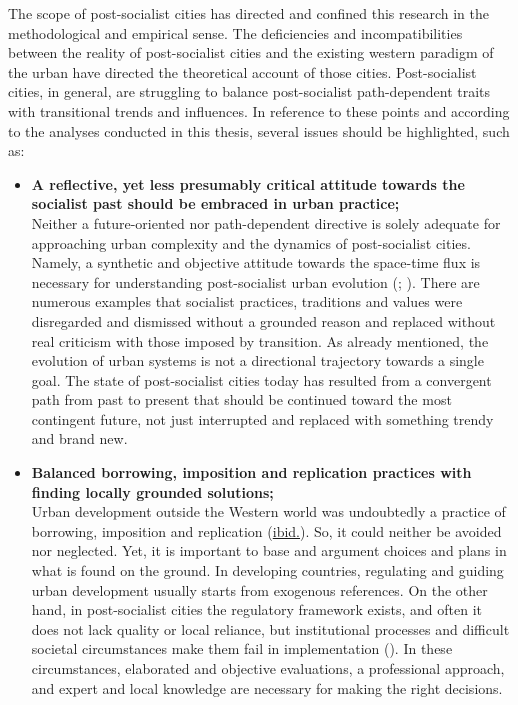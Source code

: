 \documentclass[11pt]{report}
\begin{document}
{{{The scope of post-socialist cities has directed and confined this research in the methodological and empirical sense. The deficiencies and incompatibilities between the reality of post-socialist cities and the existing western paradigm of the urban have directed the theoretical account of those cities. Post-socialist cities, in general, are struggling to balance post-socialist path-dependent traits with transitional trends and influences. In reference to these points and according to the analyses conducted in this thesis, several issues should be highlighted, such as:

\begin{itemize}
\item \textbf{A reflective, yet less presumably critical attitude towards the socialist past should be embraced in urban practice;}
\\
Neither a future-oriented nor path-dependent directive is solely adequate for approaching urban complexity and the dynamics of post-socialist cities. Namely, a synthetic and objective attitude towards the space-time flux is necessary for understanding post-socialist urban evolution  (\href{Thomas}{\citealt{thomas_thinking_1998}}; \href{Nedovic}{\citealt{nedovicbudic_waves_2006}}).
There are numerous examples that socialist practices, traditions and values were disregarded and dismissed without a grounded reason and replaced without real criticism with those imposed by transition. As already mentioned, the evolution of urban systems is not a directional trajectory towards a single goal. The state of post-socialist cities today has resulted from a convergent path from past to present that should be continued toward the most contingent future, not just interrupted and replaced with something trendy and brand new.

\item \textbf{Balanced borrowing, imposition and replication practices with finding locally grounded solutions;}
\\
Urban development outside the Western world was undoubtedly a practice of borrowing, imposition and replication (\href{Nedovic}{ibid.}). So, it could neither be avoided nor neglected. Yet, it is important to base and argument choices and plans in what is found on the ground. In developing countries, regulating and guiding urban development usually starts from exogenous references. On the other hand, in post-socialist cities the regulatory framework exists, and often it does not lack quality or local reliance, but institutional processes and difficult societal circumstances make them fail in implementation  (\href{Nedovic}{\citealt{nedovic-budic_mornings_2011}}). In these circumstances, elaborated and objective evaluations, a professional approach, and expert and local knowledge are necessary for making the right decisions.


\end{itemize}}}}
\end{document}
